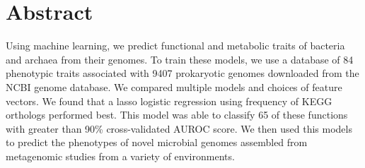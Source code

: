 \documentclass[10pt,letterpaper]{article}
\begin{document}
\section*{Abstract}
Using machine learning, we predict functional and metabolic traits of bacteria and archaea from their genomes. To train these models, we use a database of 84 phenotypic traits associated with 9407 prokaryotic genomes downloaded from the NCBI genome database. We compared multiple models and choices of feature vectors. We found that a lasso logistic regression using frequency of KEGG orthologs performed best. This model was able to classify 65 of these functions with greater than 90\% cross-validated AUROC score. We then used this models to predict the phenotypes of novel microbial genomes assembled from metagenomic studies from a variety of environments.



\linenumbers

\end{document}
